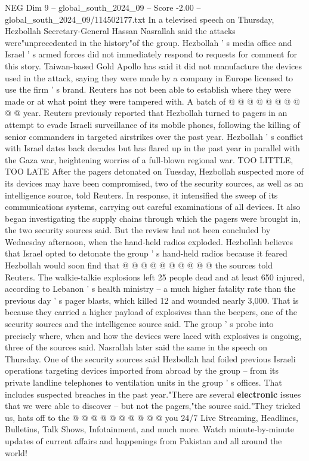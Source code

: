 \begin{textsample}{NEG Dim 9 – global\_south\_2024\_09 – Score -2.00 – global\_south\_2024\_09/114502177.txt}
In a televised speech on Thursday, Hezbollah Secretary-General Hassan Nasrallah said the attacks were"unprecedented in the history"of the group.
Hezbollah ' s media office and Israel ' s armed forces did not immediately respond to requests for comment for this story.
Taiwan-based Gold Apollo has said it did not manufacture the devices used in the attack, saying they were made by a company in Europe licensed to use the firm ' s brand.
Reuters has not been able to establish where they were made or at what point they were tampered with.
A batch of @ @ @ @ @ @ @ @ @ @ year.
Reuters previously reported that Hezbollah turned to pagers in an attempt to evade Israeli surveillance of its mobile phones, following the killing of senior commanders in targeted airstrikes over the past year.
Hezbollah ' s conflict with Israel dates back decades but has flared up in the past year in parallel with the Gaza war, heightening worries of a full-blown regional war.
TOO LITTLE, TOO LATE After the pagers detonated on Tuesday, Hezbollah suspected more of its devices may have been compromised, two of the security sources, as well as an intelligence source, told Reuters.
In response, it intensified the sweep of its communications systems, carrying out careful examinations of all devices.
It also began investigating the supply chains through which the pagers were brought in, the two security sources said.
But the review had not been concluded by Wednesday afternoon, when the hand-held radios exploded.
Hezbollah believes that Israel opted to detonate the group ' s hand-held radios because it feared Hezbollah would soon find that @ @ @ @ @ @ @ @ @ @ the sources told Reuters.
The walkie-talkie explosions left 25 people dead and at least 650 injured, according to Lebanon ' s health ministry -- a much higher fatality rate than the previous day ' s pager blasts, which killed 12 and wounded nearly 3,000.
That is because they carried a higher payload of explosives than the beepers, one of the security sources and the intelligence source said.
The group ' s probe into precisely where, when and how the devices were laced with explosives is ongoing, three of the sources said.
Nasrallah later said the same in the speech on Thursday.
One of the security sources said Hezbollah had foiled previous Israeli operations targeting devices imported from abroad by the group -- from its private landline telephones to ventilation units in the group ' s offices.
That includes suspected breaches in the past year."There are several \textbf{electronic} issues that we were able to discover -- but not the pagers,"the source said."They tricked us, hats off to the @ @ @ @ @ @ @ @ @ @ you 24/7 Live Streaming, Headlines, Bulletins, Talk Shows, Infotainment, and much more.
Watch minute-by-minute updates of current affairs and happenings from Pakistan and all around the world!

\end{textsample}
